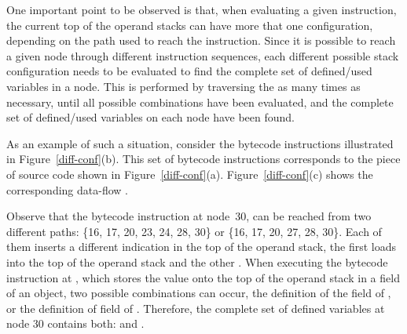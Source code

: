 One important point to be observed is that, when evaluating a
given instruction, the current top of the operand stacks can have
more that one configuration, depending on the path used to reach
the instruction. Since it is possible to reach a given node
through different instruction sequences, each different possible
stack configuration needs to be evaluated to find the complete set
of defined/used variables in a \IG node. This is performed by
traversing the \IG as many times as necessary, until all possible
combinations have been evaluated, and the complete set of
defined/used variables on each node have been found.

As an example of such a situation, consider the bytecode
instructions illustrated in Figure~\ref{diff-conf}(b). This set of
bytecode instructions corresponds to the piece of source code
shown in Figure~\ref{diff-conf}(a). Figure~\ref{diff-conf}(c)
shows the corresponding data-flow \IG.

Observe that the bytecode instruction at node~30, can be reached
from two different paths: \{16, 17, 20, 23, 24, 28, 30\} or \{16,
17, 20, 27, 28, 30\}. Each of them inserts a different indication
in the top of the operand stack, the first loads  into
the top of the operand stack and the other . When
executing the bytecode instruction at , which stores the
value onto the top of the operand stack in a field of an object,
two possible combinations can occur, the definition of the field
 of , or the definition of field  of
. Therefore, the complete set of defined variables at \IG
node 30 contains both:  and .

